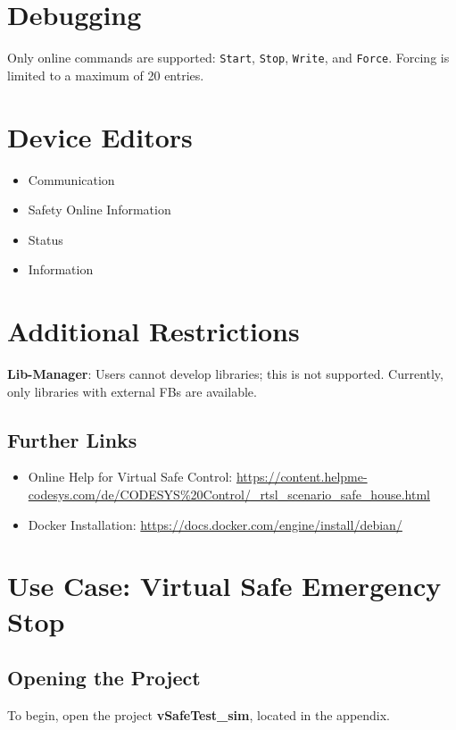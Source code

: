\documentclass[a4paper,12pt]{article}
\begin{document}
\section{Debugging}
Only online commands are supported: \texttt{Start}, \texttt{Stop}, \texttt{Write}, and \texttt{Force}. Forcing is limited to a maximum of 20 entries.

\section{Device Editors}
\begin{itemize}
	\item Communication
	\item Safety Online Information
	\item Status
	\item Information
\end{itemize}

\section{Additional Restrictions}
\textbf{Lib-Manager}: Users cannot develop libraries; this is not supported. Currently, only libraries with external FBs are available.

\subsection{Further Links}
\begin{itemize}
	\item Online Help for Virtual Safe Control: \url{https://content.helpme-codesys.com/de/CODESYS%20Control/_rtsl_scenario_safe_house.html}
	\item Docker Installation: \url{https://docs.docker.com/engine/install/debian/}
\end{itemize}

\newpage
\section{Use Case: Virtual Safe Emergency Stop}

\subsection{Opening the Project}

To begin, open the project \textbf{vSafeTest\_sim}, located in the appendix.
\end{document}
